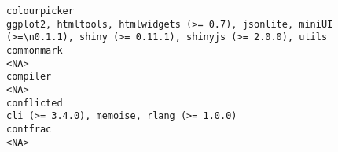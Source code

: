 \documentclass[
  letterpaper,
  DIV=11,
  numbers=noendperiod]{scrreprt}
\begin{document}
\begin{verbatim}
colourpicker                                                                                                                                                                                                                                                                                                                                                                                                                                                                                          ggplot2, htmltools, htmlwidgets (>= 0.7), jsonlite, miniUI (>=\n0.1.1), shiny (>= 0.11.1), shinyjs (>= 2.0.0), utils
commonmark                                                                                                                                                                                                                                                                                                                                                                                                                                                                                                                                                                                                            <NA>
compiler                                                                                                                                                                                                                                                                                                                                                                                                                                                                                                                                                                                                              <NA>
conflicted                                                                                                                                                                                                                                                                                                                                                                                                                                                                                                                                                                       cli (>= 3.4.0), memoise, rlang (>= 1.0.0)
contfrac                                                                                                                                                                                                                                                                                                                                                                                                                                                                                                                                                                                                              <NA>

\end{verbatim}
\end{document}
